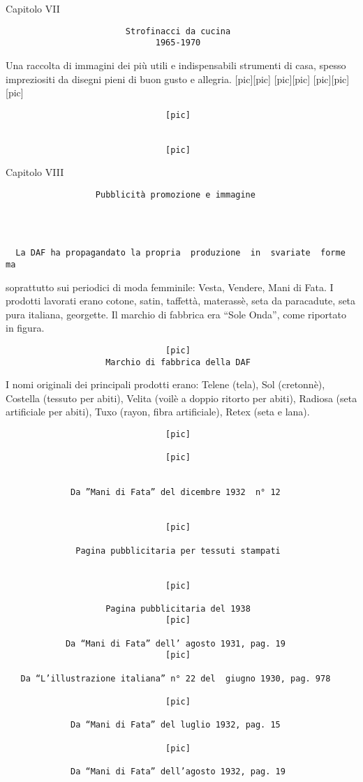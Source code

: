 Capitolo VII

\begin{verbatim}
                        Strofinacci da cucina
                              1965-1970
\end{verbatim}

Una raccolta di immagini dei più utili e indispensabili strumenti di
casa, spesso impreziositi da disegni pieni di buon gusto e allegria.
{[}pic{]}{[}pic{]} {[}pic{]}{[}pic{]} {[}pic{]}{[}pic{]} {[}pic{]}

\begin{verbatim}
                                [pic]


                                [pic]
\end{verbatim}

Capitolo VIII

\begin{verbatim}
                  Pubblicità promozione e immagine




  La DAF ha propagandato la propria  produzione  in  svariate  forme  ma
\end{verbatim}

soprattutto sui periodici di moda femminile: Vesta, Vendere, Mani di
Fata. I prodotti lavorati erano cotone, satin, taffettà, materassè, seta
da paracadute, seta pura italiana, georgette. Il marchio di fabbrica era
``Sole Onda'', come riportato in figura.

\begin{verbatim}
                                [pic]
                    Marchio di fabbrica della DAF
\end{verbatim}

I nomi originali dei principali prodotti erano: Telene (tela), Sol
(cretonnè), Costella (tessuto per abiti), Velita (voilè a doppio ritorto
per abiti), Radiosa (seta artificiale per abiti), Tuxo (rayon, fibra
artificiale), Retex (seta e lana).

\begin{verbatim}
                                [pic]

                                [pic]


             Da ”Mani di Fata” del dicembre 1932  n° 12


                                [pic]

              Pagina pubblicitaria per tessuti stampati


                                [pic]

                    Pagina pubblicitaria del 1938
                                [pic]

            Da “Mani di Fata” dell’ agosto 1931, pag. 19
                                [pic]

   Da “L’illustrazione italiana” n° 22 del  giugno 1930, pag. 978

                                [pic]

             Da “Mani di Fata” del luglio 1932, pag. 15

                                [pic]

             Da “Mani di Fata” dell’agosto 1932, pag. 19
\end{verbatim}

